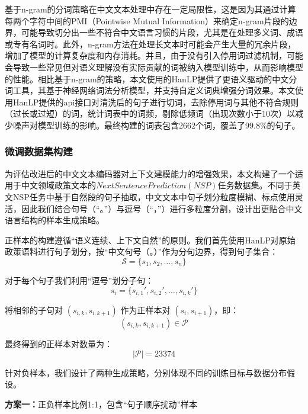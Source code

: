 \documentclass[12pt, a4paper]{ctexart}
\begin{document}
基于n-gram的分词策略在中文文本处理中存在一定局限性，这是因为其通过计算每两个字符中间的PMI（Pointwise Mutual Information）来确定n-gram片段的边界，可能导致切分出一些不符合中文语言习惯的片段，尤其是在处理多义词、成语或专有名词时。此外，n-gram方法在处理长文本时可能会产生大量的冗余片段，增加了模型的计算复杂度和内存消耗。并且，由于没有引入停用词过滤机制，可能会导致一些常见但对语义理解没有实际贡献的词被纳入模型训练中，从而影响模型的性能。相比基于n-gram的策略，本文使用的HanLP提供了更语义驱动的中文分词工具，其基于神经网络词法分析模型，并支持自定义词典增强分词效果。本文使用HanLP提供的api接口对清洗后的句子进行切词，去除停用词与其他不符合规则（过长或过短）的词，统计词表中的词频，剔除低频词（出现次数小于10次）以减少噪声对模型训练的影响。最终构建的词表包含2662个词，覆盖了99.8\%的句子。

\subsubsection{微调数据集构建}
为评估改进后的中文文本编码器对上下文建模能力的增强效果，本文构建了一个适用于中文领域政策文本的$Next Sentence Prediction (NSP)$任务数据集。不同于英文NSP任务中基于自然段的句子抽取，中文文本中句子划分粒度模糊、标点使用灵活，因此我们结合句号（“。”）与逗号（“，”）进行多粒度分割，设计出更贴合中文语言结构的样本生成策略。

正样本的构建遵循“语义连续、上下文自然”的原则。我们首先使用HanLP对原始政策语料进行句子划分，按“中文句号（。）”作为分句边界，得到句子集合：
\begin{equation}
\mathcal{S} = \{s_1, s_2, \ldots, s_n\}
\end{equation}

对于每个句子我们利用“逗号”划分子句：
\begin{equation}
s_i = \{s_{i,1}', s_{i,2}', \ldots, s_{i,k}'\}
\end{equation}

将相邻的子句对 $(s_{i,k}, s_{i,k+1})$ 作为正样本对 $(s_i, s_{i+1})$，即：
\begin{equation}
(s_{i,k}, s_{i,k+1}) \in \mathcal{P}
\end{equation}

最终得到的正样本对数量为：
\begin{equation}
|\mathcal{P}| = 23374
\end{equation}

针对负样本，我们设计了两种生成策略，分别体现不同的训练目标与数据分布假设。

\textbf{方案一：}正负样本比例1:1，包含“句子顺序扰动”样本
\end{document}
